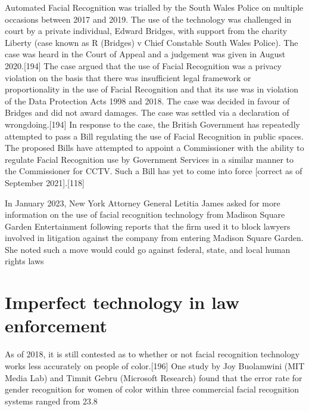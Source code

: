 Automated Facial Recognition was trialled by the South Wales Police on multiple occasions between 2017 and 2019. The use of the technology was challenged in court by a private individual, Edward Bridges, with support from the charity Liberty (case known as R (Bridges) v Chief Constable South Wales Police). The case was heard in the Court of Appeal and a judgement was given in August 2020.[194] The case argued that the use of Facial Recognition was a privacy violation on the basis that there was insufficient legal framework or proportionality in the use of Facial Recognition and that its use was in violation of the Data Protection Acts 1998 and 2018. The case was decided in favour of Bridges and did not award damages. The case was settled via a declaration of wrongdoing.[194] In response to the case, the British Government has repeatedly attempted to pass a Bill regulating the use of Facial Recognition in public spaces. The proposed Bills have attempted to appoint a Commissioner with the ability to regulate Facial Recognition use by Government Services in a similar manner to the Commissioner for CCTV. Such a Bill has yet to come into force [correct as of September 2021].[118]

In January 2023, New York Attorney General Letitia James asked for more information on the use of facial recognition technology from Madison Square Garden Entertainment following reports that the firm used it to block lawyers involved in litigation against the company from entering Madison Square Garden. She noted such a move would could go against federal, state, and local human rights laws
\newpage
\section{Imperfect technology in law enforcement}
As of 2018, it is still contested as to whether or not facial recognition technology works less accurately on people of color.[196] One study by Joy Buolamwini (MIT Media Lab) and Timnit Gebru (Microsoft Research) found that the error rate for gender recognition for women of color within three commercial facial recognition systems ranged from 23.8%

